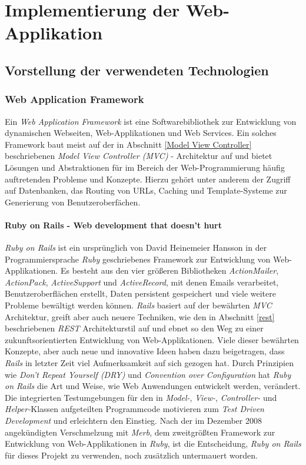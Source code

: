 \chapter{Implementierung der Web-Applikation}

\section{Vorstellung der verwendeten \nohyphens{Technologien}}

\subsection{Web Application Framework}

Ein \textit{Web Application Framework} ist eine Softwarebibliothek zur
Entwicklung von dynamischen Webseiten, Web-Applikationen und Web
Services. Ein solches Framework baut meist auf der in Abschnitt
\ref{Model View Controller} beschriebenen \textit{Model View
  Controller (MVC)}  -
Architektur auf und bietet Lösungen und Abstraktionen für im Bereich
der Web-Programmierung häufig auftretenden Probleme und
Konzepte. Hierzu gehört unter anderem der Zugriff auf Datenbanken, das
Routing von URLs, Caching und Template-Systeme zur Generierung von
Benutzeroberfächen.

\subsubsection{Ruby on Rails - Web development that doesn't hurt}

\textit{Ruby on Rails} ist ein ursprünglich von David Heinemeier
Hansson in der Programmiersprache \textit{Ruby} geschriebenes
Framework zur Entwicklung von Web-Applikationen. Es besteht aus den
vier größeren Bibliotheken \textit{ActionMailer}, \textit{ActionPack},
\textit{ActiveSupport} und \textit{ActiveRecord}, mit denen Emails
verarbeitet, Benutzeroberflächen erstellt, Daten persistent
gespeichert und viele weitere Probleme bewältigt werden
können. \textit{Rails} basiert auf der bewährten \textit{MVC}
Architektur, greift aber auch neuere Techniken, wie den in Abschnitt
\ref{rest} beschriebenen \textit{REST}
 Architekturstil
auf und ebnet so den Weg zu einer zukunftsorientierten Entwicklung von
Web-Applikationen. Viele dieser bewährten Konzepte, aber auch neue und
innovative Ideen haben dazu beigetragen, dass \textit{Rails} in
letzter Zeit viel Aufmerksamkeit auf sich gezogen hat. Durch
Prinzipien wie \textit{Don't Repeat Yourself (DRY)}
 und \textit{Convention over
  Configuration} hat \textit{Ruby on Rails} die Art und Weise, wie Web
Anwendungen entwickelt werden, verändert. Die integrierten
Testumgebungen für den in \textit{Model-}, \textit{View-},
\textit{Controller-} und \textit{Helper-}Klassen aufgeteilten
Programmcode motivieren zum \textit{Test Driven Development} und
erleichtern den Einstieg.  Nach der im Dezember 2008 angekündigten
Verschmelzung mit \textit{Merb}, dem zweitgrößten Framework zur
Entwicklung von Web-Applikationen in \textit{Ruby}, ist die
Entscheidung, \textit{Ruby on Rails} für dieses Projekt zu verwenden,
noch zusätzlich untermauert worden.

